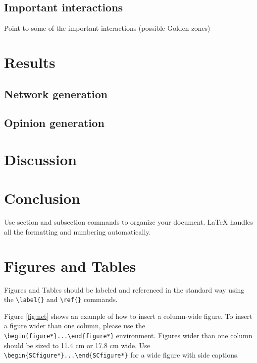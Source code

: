 \documentclass[9pt,twocolumn,twoside]{ilcss}
\begin{document}
\subsection{Important interactions}

Point to some of the important interactions (possible Golden zones)

\section{Results}

\subsection{Network generation}

\subsection{Opinion generation}

\section{Discussion}

\section{Conclusion}







Use section and subsection commands to organize your document. \LaTeX{} handles all the formatting and numbering automatically. 

\section{Figures and Tables}

Figures and Tables should be labeled and referenced in the standard way using the \verb|\label{}| and \verb|\ref{}| commands.




Figure \ref{fig:net} shows an example of how to insert a column-wide figure. To insert a figure wider than one column, please use the \verb|\begin{figure*}...\end{figure*}| environment. Figures wider than one column should be sized to 11.4 cm or 17.8 cm wide. Use \verb|\begin{SCfigure*}...\end{SCfigure*}| for a wide figure with side captions.
\end{document}
